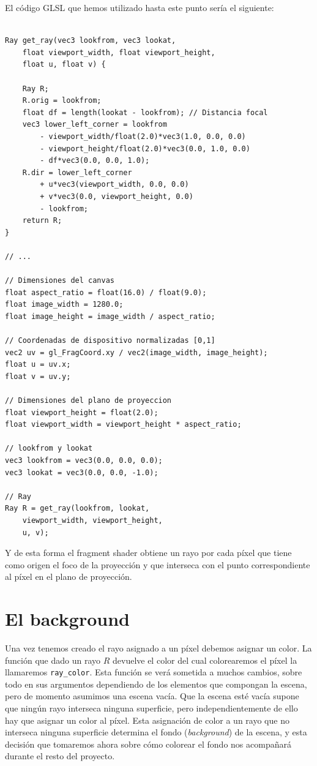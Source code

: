 El código GLSL que hemos utilizado hasta este punto sería el siguiente:

\begin{lstlisting}

Ray get_ray(vec3 lookfrom, vec3 lookat, 
    float viewport_width, float viewport_height, 
    float u, float v) {
    
    Ray R;
    R.orig = lookfrom;
    float df = length(lookat - lookfrom); // Distancia focal
    vec3 lower_left_corner = lookfrom
        - viewport_width/float(2.0)*vec3(1.0, 0.0, 0.0)
        - viewport_height/float(2.0)*vec3(0.0, 1.0, 0.0) 
        - df*vec3(0.0, 0.0, 1.0);
    R.dir = lower_left_corner 
        + u*vec3(viewport_width, 0.0, 0.0)
        + v*vec3(0.0, viewport_height, 0.0) 
        - lookfrom;
    return R;
}

// ... 

// Dimensiones del canvas
float aspect_ratio = float(16.0) / float(9.0);
float image_width = 1280.0;
float image_height = image_width / aspect_ratio;

// Coordenadas de dispositivo normalizadas [0,1]
vec2 uv = gl_FragCoord.xy / vec2(image_width, image_height); 
float u = uv.x;
float v = uv.y;

// Dimensiones del plano de proyeccion
float viewport_height = float(2.0);
float viewport_width = viewport_height * aspect_ratio;

// lookfrom y lookat
vec3 lookfrom = vec3(0.0, 0.0, 0.0);
vec3 lookat = vec3(0.0, 0.0, -1.0);

// Ray
Ray R = get_ray(lookfrom, lookat, 
    viewport_width, viewport_height, 
    u, v);
\end{lstlisting}

Y de esta forma el fragment shader obtiene un rayo por cada píxel que tiene como origen el foco de la proyección y que interseca con el punto correspondiente al píxel en el plano de proyección.

\section{El background}

Una vez tenemos creado el rayo asignado a un píxel debemos asignar un color. La función que dado un rayo $R$ devuelve el color del cual colorearemos el píxel la llamaremos \verb|ray_color|. Esta función se verá sometida a muchos cambios, sobre todo en sus argumentos dependiendo de los elementos que compongan la escena, pero de momento asumimos una escena vacía. Que la escena esté vacía supone que ningún rayo interseca ninguna superficie, pero independientemente de ello hay que asignar un color al píxel. Esta asignación de color a un rayo que no interseca ninguna superficie determina el fondo (\textit{background}) de la escena, y esta decisión que tomaremos ahora sobre cómo colorear el fondo nos acompañará durante el resto del proyecto. 

